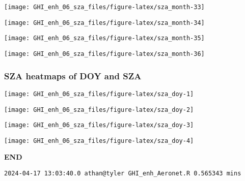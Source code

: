 \documentclass[
  10pt,
  a4paper,oneside]{article}
\begin{document}
\begin{center}\texttt{[image: GHI\_enh\_06\_sza\_files/figure-latex/sza\_month-33]} \end{center}

\begin{center}\texttt{[image: GHI\_enh\_06\_sza\_files/figure-latex/sza\_month-34]} \end{center}

\begin{center}\texttt{[image: GHI\_enh\_06\_sza\_files/figure-latex/sza\_month-35]} \end{center}

\begin{center}\texttt{[image: GHI\_enh\_06\_sza\_files/figure-latex/sza\_month-36]} \end{center}

\newpage
\FloatBarrier

\hypertarget{sza-heatmaps-of-doy-and-sza}{%
\subsubsection{SZA heatmaps of DOY and SZA}\label{sza-heatmaps-of-doy-and-sza}}

\begin{center}\texttt{[image: GHI\_enh\_06\_sza\_files/figure-latex/sza\_doy-1]} \end{center}

\begin{center}\texttt{[image: GHI\_enh\_06\_sza\_files/figure-latex/sza\_doy-2]} \end{center}

\begin{center}\texttt{[image: GHI\_enh\_06\_sza\_files/figure-latex/sza\_doy-3]} \end{center}

\begin{center}\texttt{[image: GHI\_enh\_06\_sza\_files/figure-latex/sza\_doy-4]} \end{center}

\textbf{END}

\begin{verbatim}
2024-04-17 13:03:40.0 athan@tyler GHI_enh_Aeronet.R 0.565343 mins
\end{verbatim}
\end{document}
